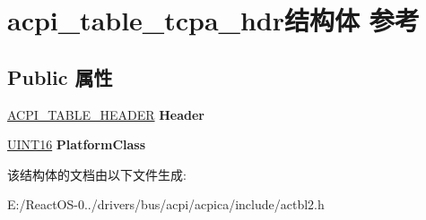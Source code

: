 \hypertarget{structacpi__table__tcpa__hdr}{}\section{acpi\+\_\+table\+\_\+tcpa\+\_\+hdr结构体 参考}
\label{structacpi__table__tcpa__hdr}
\subsection*{Public 属性}
\begin{DoxyCompactItemize}
\item 
\mbox{\label{structacpi__table__tcpa__hdr_a82302b45282da1d653725b354d5b066e}} 
\hyperlink{structacpi__table__header}{A\+C\+P\+I\+\_\+\+T\+A\+B\+L\+E\+\_\+\+H\+E\+A\+D\+ER} {\bfseries Header}
\item 
\mbox{\label{structacpi__table__tcpa__hdr_aa41c25385f1f8ac7ac820bf51664b897}} 
\hyperlink{_processor_bind_8h_a09f1a1fb2293e33483cc8d44aefb1eb1}{U\+I\+N\+T16} {\bfseries Platform\+Class}
\end{DoxyCompactItemize}


该结构体的文档由以下文件生成\+:\begin{DoxyCompactItemize}
\item 
E\+:/\+React\+O\+S-\/0../drivers/bus/acpi/acpica/include/actbl2.\+h\end{DoxyCompactItemize}
